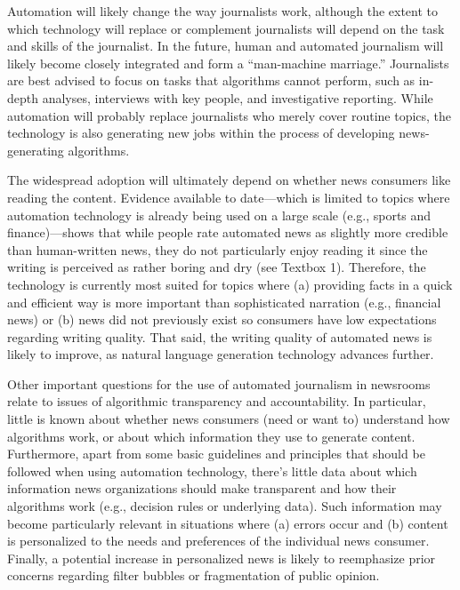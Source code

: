 \documentclass[notoc, symmetric, nobib, nols]{towcenter-book}
\begin{document}
Automation will likely change the way journalists work, although the extent to which technology will replace or complement journalists will depend on the task and skills of the journalist. In the future, human and automated journalism will likely become closely integrated and form a ``man-machine marriage.'' Journalists are best advised to focus on tasks that algorithms cannot perform, such as in-depth analyses, interviews with key people, and investigative reporting. While automation will probably replace journalists who merely cover routine topics, the technology is also generating new jobs within the process of developing news-generating algorithms. 

The widespread adoption will ultimately depend on whether news consumers like reading the content. Evidence available to date---which is limited to topics where automation technology is already being used on a large scale (e.g., sports and finance)---shows that while people rate automated news as slightly more credible than human-written news, they do not particularly enjoy reading it since the writing is perceived as rather boring and dry (see Textbox 1). Therefore, the technology is currently most suited for topics where (a) providing facts in a quick and efficient way is more important than sophisticated narration (e.g., financial news) or (b) news did not previously exist so consumers have low expectations regarding writing quality. That said, the writing quality of automated news is likely to improve, as natural language generation technology advances further.

Other important questions for the use of automated journalism in newsrooms relate to issues of algorithmic transparency and accountability. In particular, little is known about whether news consumers (need or want to) understand how algorithms work, or about which information they use to generate content. Furthermore, apart from some basic guidelines and principles that should be followed when using automation technology, there’s little data about which information news organizations should make transparent and how their algorithms work (e.g., decision rules or underlying data). Such information may become particularly relevant in situations where (a) errors occur and (b) content is personalized to the needs and preferences of the individual news consumer. Finally, a potential increase in personalized news is likely to reemphasize prior concerns regarding filter bubbles or fragmentation of public opinion.
\end{document}
